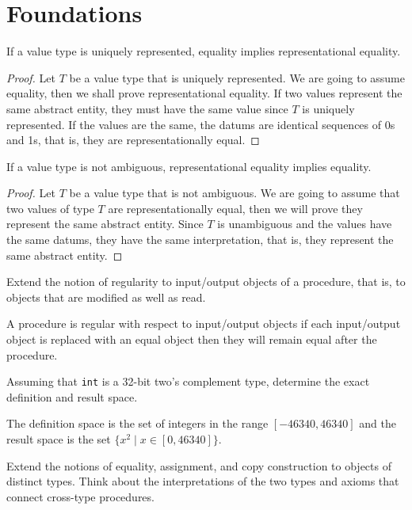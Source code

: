 
\chapter{Foundations}

\begin{lemma}
	If a value type is uniquely represented, equality implies representational equality.
\end{lemma}

\begin{proof}
	Let $T$ be a value type that is uniquely represented. We are going to assume equality,
	then we shall prove representational equality. If two values represent the same abstract entity,
	they must have the same value since $T$ is uniquely represented. If the values are the same, the datums
	are identical sequences of 0s and 1s, that is, they are representationally equal.
\end{proof}

\begin{lemma}
	If a value type is not ambiguous, representational equality implies equality.
\end{lemma}

\begin{proof}
	Let $T$ be a value type that is not ambiguous. We are going to assume that two values of type $T$ are
	representationally equal, then we will prove they represent the same abstract entity. Since $T$ is
	unambiguous and the values have the same datums, they have the same interpretation, that is, they
	represent the same abstract entity.
\end{proof}

\begin{exercise}
	Extend the notion of regularity to input/output objects of a procedure, that is, to objects that are
	modified as well as read.
\end{exercise}

\begin{solution}
	A procedure is regular with respect to input/output objects if each input/output object is replaced
	with an equal object then they will remain equal after the procedure.
\end{solution}

\begin{exercise}
	Assuming that \verb|int| is a 32-bit two's complement type, determine the exact definition and result space.
\end{exercise}

\begin{solution}
	The definition space is the set of integers in the range $[-46340, 46340]$ and the result space is
	the set $\{ x^2 \mid x \in [0, 46340] \}$.
\end{solution}

\begin{project}
	Extend the notions of equality, assignment, and copy construction to objects of distinct types. Think
	about the interpretations of the two types and axioms that connect cross-type procedures.
\end{project}
